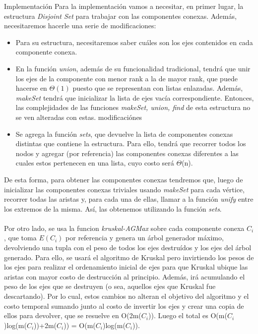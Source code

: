 \documentclass[a4paper]{article}
\begin{document}
\begin{subsection}{Implementaci\'{o}n}
Para la implementaci\'{o}n vamos a necesitar, en primer lugar, la estructura \textit{Disjoint Set} para trabajar con las componentes conexas. Adem\'{a}s, necesitaremos hacerle una serie de modificaciones:
\begin{itemize}
	\item{Para su estructura, necesitaremos saber cu\'{a}les son los ejes contenidos en cada componente conexa.}
	\item{En la funci\'{o}n \textit{union}, adem\'{a}s de su funcionalidad tradicional, tendr\'{a} que unir los ejes de la componente con menor rank a la de mayor rank, que puede hacerse en $\Theta(1)$ puesto que  se representan con listas enlazadas. Adem\'{a}s, \textit{makeSet} tendr\'{a} que inicializar la lista de ejes vac\'{i}a correspondiente. Entonces, las complejidades de las funciones \textit{makeSet, union, find} de esta estructura no se ven alteradas con estas. modificaci\'{o}nes}
    \item{ Se agrega la funci\'{o}n \textit{sets}, que devuelve la lista de componentes conexas distintas que contiene la estructura. Para ello, tendr\'{a} que recorrer todos los nodos y agregar (por referencia) las componentes conexas diferentes a las cuales estos pertenecen en una lista, cuyo costo ser\'{a} $\Theta$(n).}
\end{itemize}
De esta forma, para obtener las componentes conexas tendremos que, luego de inicializar las componentes conexas triviales usando \textit{makeSet} para cada v\'{e}rtice, recorrer todas las aristas y, para cada una de ellas, llamar a la funci\'{o}n \textit{unify} entre los extremos de la misma. As\'{i}, las obtenemos utilizando la funci\'{o}n \textit{sets}. \\ \\
Por otro lado, se usa la funcion \textit{kruskal-AGMax} sobre cada componente conexa $C_i$, que toma $E(C_i)$ por referencia y genera un \'{a}rbol generador m\'{a}ximo, devolviendo una tupla con el peso de todos los ejes destru\'{i}dos y los ejes del \'{a}rbol generado. Para ello, se usar\'{a} el algoritmo de Kruskal pero invirtiendo los pesos de los ejes para realizar el ordenamiento inicial de ejes para que Kruskal ubique las aristas con mayor costo de destrucci\'{o}n al principio. Adem\'{a}s, ir\'{a} acumulando el peso de los ejes que se destruyen (o sea, aquellos ejes que Kruskal fue descartando). Por lo cual, estos cambios no alteran el objetivo del algoritmo y el costo temporal sumando junto al costo de invertir los ejes y crear una copia de ellos para devolver, que se resuelve en O(2m($C_i$)). Luego el total es O(m($C_i$)log(m($C_i$))+2m($C_i$)) = O(m($C_i$)log(m($C_i$)). \\ \\ 

\end{subsection}
\end{document}

